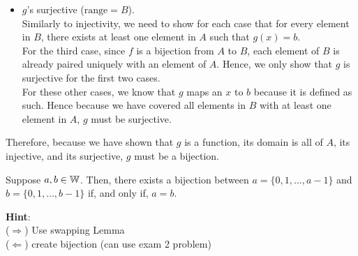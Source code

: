 {\begin{itemize}
                    \noindent If \(x = a_1\) and \(y \ne a_2\) (or \(x = a_2\) and \(y \ne a_1\)) the outputs from \(g(x)\) and \(g(y)\) would differ. That is, if \(x = a_1\), then \(g(x) = b_2\), and if \(y \ne a_2\), \(g(y) = f(y)\) which would have the same mapping (see paragraph 2). Since \(b_2 = f(a_2)\) and \(f\) is injective, \(f(y) \ne b_2\) unless \(y = a_2\), which is not the case. \\

                    \noindent Therefore, the only possibility for \(g(x) = g(y)\) is when \(x = y\), thus confirming that \(g\) is injective for all elements in \(A\). \\
                    
                    \item \(g\)'s surjective (\(\text{range} = B\)). \\
                    Similarly to injectivity, we need to show for each case that for every element in \(B\), there exists at least one element in \(A\) such that \(g(x) = b\). \\ 
                    
                    For the third case, since \(f\) is a bijection from \(A\) to \(B\), each element of \(B\) is already paired uniquely with an element of \(A\). Hence, we only show that \(g\) is surjective for the first two cases. \\

                    For these other cases, we know that \(g\) maps an \(x\) to \(b\) because it is defined as such. Hence because we have covered all elements in \(B\) with at least one element in \(A\), \(g\) must be surjective.
                \end{itemize} 
                Therefore, because we have shown that \(g\) is a function, its domain is all of \(A\), its injective, and its surjective, \(g\) must be a bijection.
            }


            \begin{exercise}
                {}Suppose \(a,b \in \mathbb{W}\). Then, there exists a bijection between \(a = \{0,1,\dots,a - 1\}\) and \(b = \{0,1,\dots,b - 1\}\) if, and only if, \(a = b\).
            \end{exercise}
            \textbf{Hint}:\\
            (\(\Rightarrow\)) Use swapping Lemma \\
            (\(\Leftarrow\)) create bijection (can use exam 2 problem)
    
